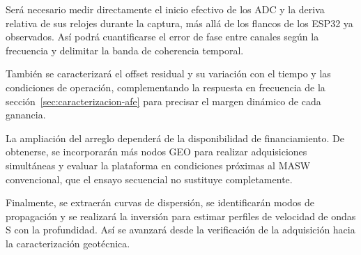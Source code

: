 Será necesario medir directamente el inicio efectivo de los ADC y la deriva relativa de sus relojes durante la captura, más allá de los flancos de los ESP32 ya observados. Así podrá cuantificarse el error de fase entre canales según la frecuencia y delimitar la banda de coherencia temporal.

También se caracterizará el offset residual y su variación con el tiempo y las condiciones de operación, complementando la respuesta en frecuencia de la sección~\ref{sec:caracterizacion-afe} para precisar el margen dinámico de cada ganancia.

La ampliación del arreglo dependerá de la disponibilidad de financiamiento. De obtenerse, se incorporarán más nodos GEO para realizar adquisiciones simultáneas y evaluar la plataforma en condiciones próximas al MASW convencional, que el ensayo secuencial no sustituye completamente.

Finalmente, se extraerán curvas de dispersión, se identificarán modos de propagación y se realizará la inversión para estimar perfiles de velocidad de ondas S con la profundidad. Así se avanzará desde la verificación de la adquisición hacia la caracterización geotécnica.
